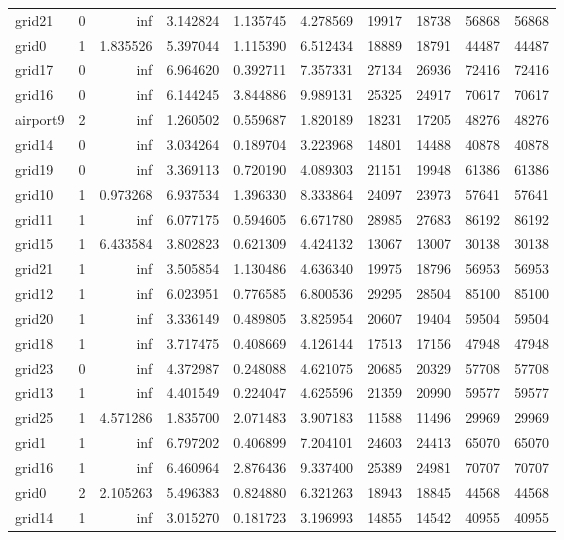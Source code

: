 \begin{longtable}{|l|r|r|r|r|r|r|r|r|r|}
grid21 & 0 & inf & 3.142824 & 1.135745 & 4.278569 & 19917 & 18738 & 56868 & 56868 \\
grid0 & 1 & 1.835526 & 5.397044 & 1.115390 & 6.512434 & 18889 & 18791 & 44487 & 44487 \\
grid17 & 0 & inf & 6.964620 & 0.392711 & 7.357331 & 27134 & 26936 & 72416 & 72416 \\
grid16 & 0 & inf & 6.144245 & 3.844886 & 9.989131 & 25325 & 24917 & 70617 & 70617 \\
airport9 & 2 & inf & 1.260502 & 0.559687 & 1.820189 & 18231 & 17205 & 48276 & 48276 \\
grid14 & 0 & inf & 3.034264 & 0.189704 & 3.223968 & 14801 & 14488 & 40878 & 40878 \\
grid19 & 0 & inf & 3.369113 & 0.720190 & 4.089303 & 21151 & 19948 & 61386 & 61386 \\
grid10 & 1 & 0.973268 & 6.937534 & 1.396330 & 8.333864 & 24097 & 23973 & 57641 & 57641 \\
grid11 & 1 & inf & 6.077175 & 0.594605 & 6.671780 & 28985 & 27683 & 86192 & 86192 \\
grid15 & 1 & 6.433584 & 3.802823 & 0.621309 & 4.424132 & 13067 & 13007 & 30138 & 30138 \\
grid21 & 1 & inf & 3.505854 & 1.130486 & 4.636340 & 19975 & 18796 & 56953 & 56953 \\
grid12 & 1 & inf & 6.023951 & 0.776585 & 6.800536 & 29295 & 28504 & 85100 & 85100 \\
grid20 & 1 & inf & 3.336149 & 0.489805 & 3.825954 & 20607 & 19404 & 59504 & 59504 \\
grid18 & 1 & inf & 3.717475 & 0.408669 & 4.126144 & 17513 & 17156 & 47948 & 47948 \\
grid23 & 0 & inf & 4.372987 & 0.248088 & 4.621075 & 20685 & 20329 & 57708 & 57708 \\
grid13 & 1 & inf & 4.401549 & 0.224047 & 4.625596 & 21359 & 20990 & 59577 & 59577 \\
grid25 & 1 & 4.571286 & 1.835700 & 2.071483 & 3.907183 & 11588 & 11496 & 29969 & 29969 \\
grid1 & 1 & inf & 6.797202 & 0.406899 & 7.204101 & 24603 & 24413 & 65070 & 65070 \\
grid16 & 1 & inf & 6.460964 & 2.876436 & 9.337400 & 25389 & 24981 & 70707 & 70707 \\
grid0 & 2 & 2.105263 & 5.496383 & 0.824880 & 6.321263 & 18943 & 18845 & 44568 & 44568 \\
grid14 & 1 & inf & 3.015270 & 0.181723 & 3.196993 & 14855 & 14542 & 40955 & 40955 \\

\end{longtable}
